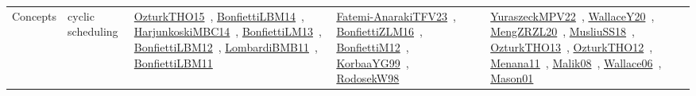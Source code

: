 {\begin{longtable}{lp{3cm}>{\raggedright\arraybackslash}p{6cm}>{\raggedright\arraybackslash}p{6cm}>{\raggedright\arraybackslash}p{8cm}}
Concepts & cyclic scheduling & \href{../works/OzturkTHO15.pdf}{OzturkTHO15}~\cite{OzturkTHO15}, \href{../works/BonfiettiLBM14.pdf}{BonfiettiLBM14}~\cite{BonfiettiLBM14}, \href{../works/HarjunkoskiMBC14.pdf}{HarjunkoskiMBC14}~\cite{HarjunkoskiMBC14}, \href{../works/BonfiettiLM13.pdf}{BonfiettiLM13}~\cite{BonfiettiLM13}, \href{../works/BonfiettiLBM12.pdf}{BonfiettiLBM12}~\cite{BonfiettiLBM12}, \href{../works/LombardiBMB11.pdf}{LombardiBMB11}~\cite{LombardiBMB11}, \href{../works/BonfiettiLBM11.pdf}{BonfiettiLBM11}~\cite{BonfiettiLBM11} & \href{../works/Fatemi-AnarakiTFV23.pdf}{Fatemi-AnarakiTFV23}~\cite{Fatemi-AnarakiTFV23}, \href{../works/BonfiettiZLM16.pdf}{BonfiettiZLM16}~\cite{BonfiettiZLM16}, \href{../works/BonfiettiM12.pdf}{BonfiettiM12}~\cite{BonfiettiM12}, \href{../works/KorbaaYG99.pdf}{KorbaaYG99}~\cite{KorbaaYG99}, \href{../works/RodosekW98.pdf}{RodosekW98}~\cite{RodosekW98} & \href{../works/YuraszeckMPV22.pdf}{YuraszeckMPV22}~\cite{YuraszeckMPV22}, \href{../works/WallaceY20.pdf}{WallaceY20}~\cite{WallaceY20}, \href{../works/MengZRZL20.pdf}{MengZRZL20}~\cite{MengZRZL20}, \href{../works/MusliuSS18.pdf}{MusliuSS18}~\cite{MusliuSS18}, \href{../works/OzturkTHO13.pdf}{OzturkTHO13}~\cite{OzturkTHO13}, \href{../works/OzturkTHO12.pdf}{OzturkTHO12}~\cite{OzturkTHO12}, \href{../works/Menana11.pdf}{Menana11}~\cite{Menana11}, \href{../works/Malik08.pdf}{Malik08}~\cite{Malik08}, \href{../works/Wallace06.pdf}{Wallace06}~\cite{Wallace06}, \href{../works/Mason01.pdf}{Mason01}~\cite{Mason01}\\

\end{longtable}}
